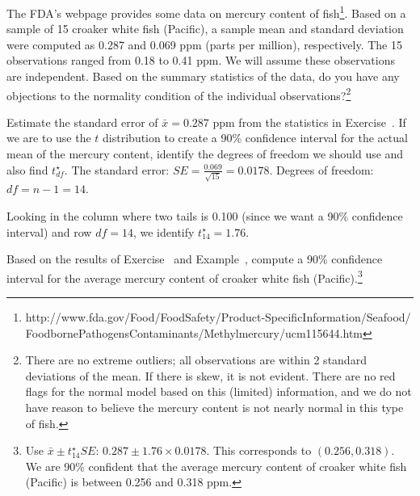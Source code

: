 \begin{exercise} \label{croakerWhiteFishPacificExerConditions}
The FDA's webpage provides some data on mercury content of fish\footnote{http://www.fda.gov/Food/FoodSafety/Product-SpecificInformation/Seafood/\\ FoodbornePathogensContaminants/Methylmercury/ucm115644.htm}. Based on a sample of 15 croaker white fish (Pacific), a sample mean and standard deviation were computed as 0.287 and 0.069 ppm (parts per million), respectively. The 15 observations ranged from 0.18 to 0.41 ppm. We will assume these observations are independent. Based on the summary statistics of the data, do you have any objections to the normality condition of the individual observations?\footnote{There are no extreme outliers; all observations are within 2 standard deviations of the mean. If there is skew, it is not evident. There are no red flags for the normal model based on this (limited) information, and we do not have reason to believe the mercury content is not nearly normal in this type of fish.}
\end{exercise}

\begin{example}{Estimate the standard error of $\bar{x}=0.287$ ppm from the statistics in Exercise~. If we are to use the $t$ distribution to create a 90\% confidence interval for the actual mean of the mercury content, identify the degrees of freedom we should use and also find $t^{\star}_{df}$.}
\label{croakerWhiteFishPacificExerSEDFTStar}
The standard error: $SE = \frac{0.069}{\sqrt{15}} = 0.0178$. Degrees of freedom: $df = n - 1 = 14$.

Looking in the column where two tails is 0.100 (since we want a 90\% confidence interval) and row $df=14$, we identify $t^{\star}_{14} = 1.76$.
\end{example}

\begin{exercise}
Based on the results of Exercise~ and Example~, compute a 90\% confidence interval for the average mercury content of croaker white fish (Pacific).\footnote{Use $\bar{x} \pm t^{\star}_{14} SE$: $0.287 \pm 1.76\times 0.0178$. This corresponds to $(0.256, 0.318)$. We are 90\% confident that the average mercury content of croaker white fish (Pacific) is between 0.256 and 0.318 ppm.}
\end{exercise}




